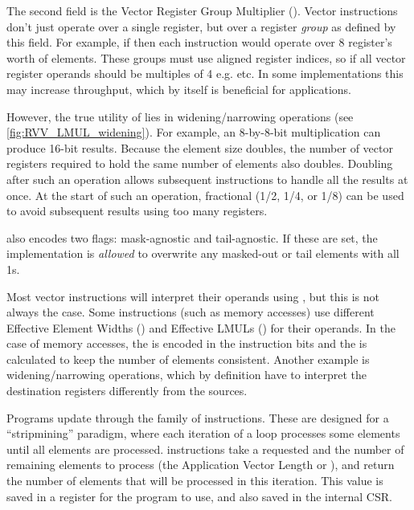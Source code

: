 The second field is the Vector Register Group Multiplier ().
Vector instructions don't just operate over a single register, but over a register \emph{group} as defined by this field.
For example, if  then each instruction would operate over 8 register's worth of elements.
These groups must use aligned register indices, so if  all vector register operands should be multiples of 4 e.g.  etc.
In some implementations this may increase throughput, which by itself is beneficial for applications.

However, the true utility of  lies in widening/narrowing operations (see \cref{fig:RVV_LMUL_widening}).
For example, an 8-by-8-bit multiplication can produce 16-bit results.
Because the element size doubles, the number of vector registers required to hold the same number of elements also doubles.
Doubling  after such an operation allows subsequent instructions to handle all the results at once.
At the start of such an operation, fractional  (1/2, 1/4, or 1/8) can be used to avoid subsequent results using too many registers.

 also encodes two flags: mask-agnostic and tail-agnostic.
If these are set, the implementation is \emph{allowed} to overwrite any masked-out or tail elements with all 1s.

Most vector instructions will interpret their operands using , but this is not always the case.
Some instructions (such as memory accesses) use different Effective Element Widths () and Effective LMULs () for their operands.
In the case of memory accesses, the  is encoded in the instruction bits and the  is calculated to keep the number of elements consistent.
Another example is widening/narrowing operations, which by definition have to interpret the destination registers differently from the sources.

Programs update  through the  family of instructions.
These are designed for a ``stripmining'' paradigm, where each iteration of a loop processes some elements until all elements are processed.
 instructions take a requested  and the number of remaining elements to process (the Application Vector Length or ), and return the number of elements that will be processed in this iteration.
This value is saved in a register for the program to use, and also saved in the internal  CSR.

